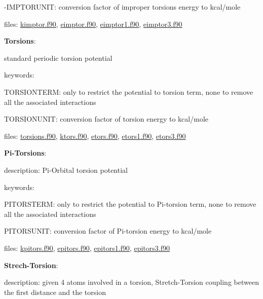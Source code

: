 \begin{DoxyItemize}
\begin{DoxyItemize}
-\/\-I\-M\-P\-T\-O\-R\-U\-N\-I\-T\-: conversion factor of improper torsions energy to kcal/mole
\item files\-: \hyperlink{kimptor_8f90}{kimptor.\-f90}, \hyperlink{eimptor_8f90}{eimptor.\-f90}, \hyperlink{eimptor1_8f90}{eimptor1.\-f90}, \hyperlink{eimptor3_8f90}{eimptor3.\-f90}
\end{DoxyItemize}
\item {\bfseries Torsions}\-:
\begin{DoxyItemize}
\item standard periodic torsion potential
\item keywords\-:
\begin{DoxyItemize}
\item T\-O\-R\-S\-I\-O\-N\-T\-E\-R\-M\-: only to restrict the potential to torsion term, none to remove all the associated interactions
\item T\-O\-R\-S\-I\-O\-N\-U\-N\-I\-T\-: conversion factor of torsion energy to kcal/mole
\end{DoxyItemize}
\item files\-: \hyperlink{torsions_8f90}{torsions.\-f90}, \hyperlink{ktors_8f90}{ktors.\-f90}, \hyperlink{etors_8f90}{etors.\-f90}, \hyperlink{etors1_8f90}{etors1.\-f90}, \hyperlink{etors3_8f90}{etors3.\-f90}
\end{DoxyItemize}
\item {\bfseries Pi-\/\-Torsions}\-:
\begin{DoxyItemize}
\item description\-: Pi-\/\-Orbital torsion potential
\item keywords\-:
\begin{DoxyItemize}
\item P\-I\-T\-O\-R\-S\-T\-E\-R\-M\-: only to restrict the potential to Pi-\/torsion term, none to remove all the associated interactions
\item P\-I\-T\-O\-R\-S\-U\-N\-I\-T\-: conversion factor of Pi-\/torsion energy to kcal/mole
\end{DoxyItemize}
\item files\-: \hyperlink{kpitors_8f90}{kpitors.\-f90}, \hyperlink{epitors_8f90}{epitors.\-f90}, \hyperlink{epitors1_8f90}{epitors1.\-f90}, \hyperlink{epitors3_8f90}{epitors3.\-f90}
\end{DoxyItemize}
\item {\bfseries Strech-\/\-Torsion}\-:
\begin{DoxyItemize}
\item description\-: given 4 atoms involved in a torsion, Stretch-\/\-Torsion coupling between the first distance and the torsion

\end{DoxyItemize}
\end{DoxyItemize}
